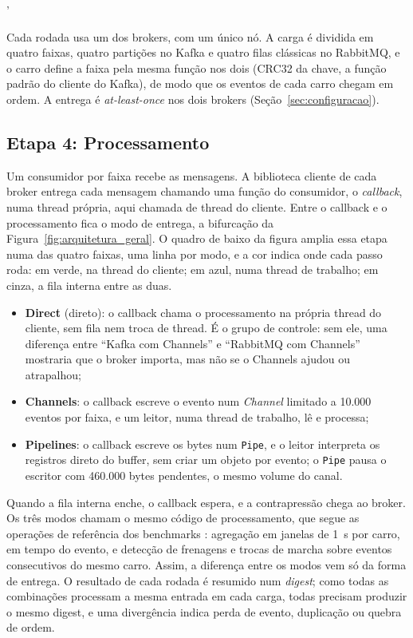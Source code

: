 '\documentclass[12pt]{article}
\begin{document}
Cada rodada usa um dos brokers, com um único nó. A carga é dividida em quatro faixas,
quatro partições no Kafka e quatro filas clássicas no RabbitMQ, e o carro define a faixa
pela mesma função nos dois (CRC32 da chave, a função padrão do cliente do Kafka), de modo
que os eventos de cada carro chegam em ordem. A entrega é \textit{at-least-once} nos dois
brokers (Seção~\ref{sec:configuracao}).

\subsection{Etapa 4: Processamento}
\label{sec:processamento}

Um consumidor por faixa recebe as mensagens. A biblioteca cliente de cada broker entrega
cada mensagem chamando uma função do consumidor, o \textit{callback}, numa thread própria,
aqui chamada de thread do cliente. Entre o callback e o processamento fica o modo de
entrega, a bifurcação da Figura~\ref{fig:arquitetura_geral}. O quadro de baixo da
figura amplia essa etapa numa das quatro faixas, uma linha por modo, e a cor indica onde
cada passo roda: em verde, na thread do cliente; em azul, numa thread de trabalho; em
cinza, a fila interna entre as duas.

\begin{itemize}
  \item \textbf{Direct} (direto): o callback chama o processamento na própria thread do
        cliente, sem fila nem troca de thread. É o grupo de controle: sem ele, uma
        diferença entre ``Kafka com Channels'' e ``RabbitMQ com Channels'' mostraria que
        o broker importa, mas não se o Channels ajudou ou atrapalhou;
  \item \textbf{Channels}: o callback escreve o evento num \textit{Channel} limitado a
        10.000 eventos por faixa, e um leitor, numa thread de trabalho, lê e processa;
  \item \textbf{Pipelines}: o callback escreve os bytes num \texttt{Pipe}, e o leitor
        interpreta os registros direto do buffer, sem criar um objeto por evento; o
        \texttt{Pipe} pausa o escritor com 460.000 bytes pendentes, o mesmo volume do
        canal.
\end{itemize}

Quando a fila interna enche, o callback espera, e a contrapressão chega ao broker. Os três
modos chamam o mesmo código de processamento, que segue as operações de referência dos
benchmarks \cite{arasu:2004,mutschler:2013}: agregação em janelas de 1~s por carro, em
tempo do evento, e detecção de frenagens e trocas de marcha sobre eventos consecutivos do
mesmo carro. Assim, a diferença entre os modos vem só da forma de entrega. O resultado de
cada rodada é resumido num \textit{digest}; como todas as combinações processam a mesma
entrada em cada carga, todas precisam produzir o mesmo digest, e uma divergência indica
perda de evento, duplicação ou quebra de ordem.
\end{document}

